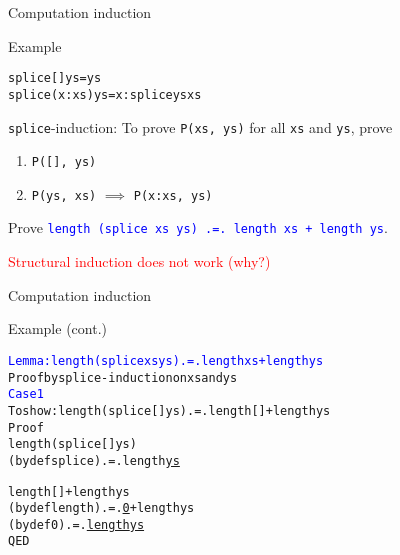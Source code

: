 \documentclass{beamer}
\def\code#1{\texttt{\frenchspacing#1}}
\begin{document}
\begin{frame}[fragile]{Computation induction}

\begin{exampleblock}{Example}
\begin{alltt}
splice [] ys = ys
splice (x:xs) ys = x : splice ys xs
\end{alltt}

\pause

\code{splice}-induction: To prove \code{P(xs, ys)} for all \code{xs} and \code{ys}, prove\pause
\begin{enumerate}
    \item \code{P([], ys)}\pause
    \item \code{P(ys, xs)} $\implies$ \code{P(x:xs, ys)}
\end{enumerate}

\pause

\vspace{0.5cm}
Prove \textcolor{blue}{\code{length (splice xs ys) .=. length xs + length ys}}.

\pause

\vspace{0.25cm}
\textcolor{red}{Structural induction does not work (why?)}
\end{exampleblock}

\end{frame}

\begin{frame}[fragile]{Computation induction}

\begin{exampleblock}{Example (cont.)}
\small\begin{alltt}
\textcolor{blue}{Lemma: length (splice xs ys) .=. length xs + length ys}\pause
Proof by splice-induction on xs and ys\pause
\textcolor{blue}{Case 1}\pause
  To show: length (splice [] ys) .=. length [] + length ys
  Proof
                        length (splice [] ys)\pause
    (by def splice) .=. length \underline{ys}

                        length [] + length ys\pause
    (by def length) .=. \underline{0} + length ys\pause
    (by def 0)      .=. \underline{length ys}
  QED
\end{alltt}\normalsize
\end{exampleblock}

\end{frame}
\end{document}
